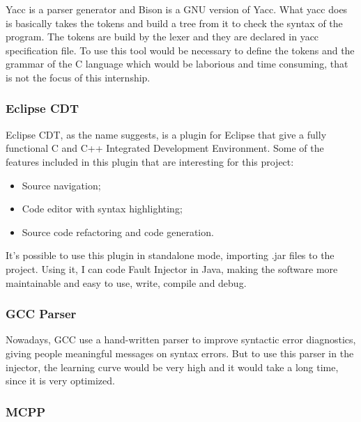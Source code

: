 Yacc is a parser generator and Bison is a GNU version of Yacc. What yacc does is basically takes the tokens and build a tree from it to check the syntax of the program. The tokens are build by the lexer and they are declared in yacc specification file. To use this tool would be necessary to define the tokens and the grammar of the C language which would be laborious and time consuming, that is not the focus of this internship.

\subsubsection{Eclipse CDT}
\hypertarget{Eclipse CDT}{}

Eclipse CDT, as the name suggests, is a plugin for Eclipse that give a fully functional C and C++ Integrated Development Environment.
Some of the features included in this plugin that are interesting for this project:
\begin{itemize}
	\item Source navigation;
	\item Code editor with syntax highlighting;
	\item Source code refactoring and code generation.
\end{itemize}

It's possible to use this plugin in standalone mode, importing .jar files to the project.
Using it, I can code Fault Injector in Java, making the software more maintainable and easy to use, write, compile and debug.
\\

\subsubsection{GCC Parser}
\hypertarget{GCC Parser}{}

Nowadays, GCC use a hand-written parser to improve syntactic error diagnostics, giving people meaningful messages on syntax errors. But to use this parser in the injector, the learning curve would be very high and it would take a long time, since it is very optimized.\\

\subsubsection{MCPP}
\hypertarget{MCPP}{}

